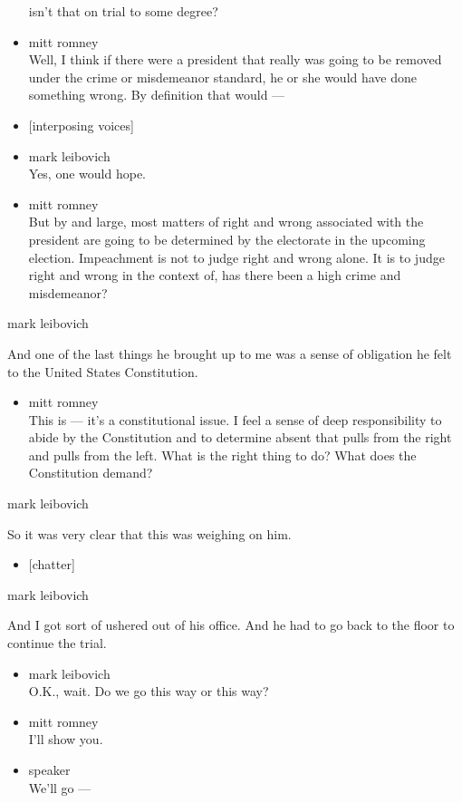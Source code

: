 \begin{itemize}
  isn't that on trial to some degree?
\item
  mitt romney\\
  Well, I think if there were a president that really was going to be
  removed under the crime or misdemeanor standard, he or she would have
  done something wrong. By definition that would ---
\item
  {[}interposing voices{]}
\item
  mark leibovich\\
  Yes, one would hope.
\item
  mitt romney\\
  But by and large, most matters of right and wrong associated with the
  president are going to be determined by the electorate in the upcoming
  election. Impeachment is not to judge right and wrong alone. It is to
  judge right and wrong in the context of, has there been a high crime
  and misdemeanor?
\end{itemize}

mark leibovich

And one of the last things he brought up to me was a sense of obligation
he felt to the United States Constitution.

\begin{itemize}
\tightlist
\item
  mitt romney\\
  This is --- it's a constitutional issue. I feel a sense of deep
  responsibility to abide by the Constitution and to determine absent
  that pulls from the right and pulls from the left. What is the right
  thing to do? What does the Constitution demand?
\end{itemize}

mark leibovich

So it was very clear that this was weighing on him.

\begin{itemize}
\tightlist
\item
  {[}chatter{]}
\end{itemize}

mark leibovich

And I got sort of ushered out of his office. And he had to go back to
the floor to continue the trial.

\begin{itemize}
\item
  mark leibovich\\
  O.K., wait. Do we go this way or this way?
\item
  mitt romney\\
  I'll show you.
\item
  speaker\\
  We'll go ---
\end{itemize}

